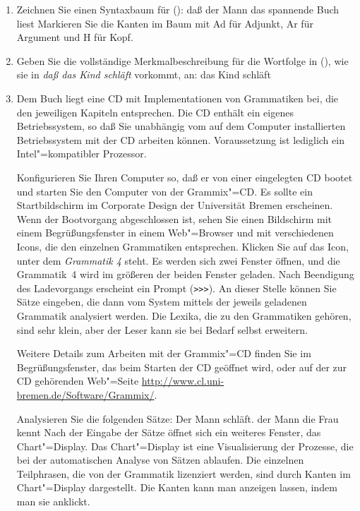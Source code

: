 \begin{enumerate}
\item Zeichnen Sie einen Syntaxbaum für ():
\ea
daß der Mann das spannende Buch liest
\z
Markieren Sie die Kanten im Baum mit Ad für Adjunkt, Ar für Argument und
H für Kopf.
\item Geben Sie die vollständige Merkmalbeschreibung für die Wortfolge in (), wie sie in
  \emph{daß das Kind schläft} vorkommt,  an:
      \ea
      das Kind schläft
      \z
\item\label{uebung-grammix-kapitel4}
      Dem Buch liegt eine CD mit Implementationen von Grammatiken bei, die
      den jeweiligen Kapiteln entsprechen. Die CD enthält ein eigenes Betriebssystem,
      so daß Sie unabhängig vom auf dem Computer installierten Betriebssystem
      mit der CD arbeiten können. Voraussetzung ist lediglich ein Intel"=kompatibler Prozessor.

      Konfigurieren Sie Ihren Computer so, daß er von einer eingelegten CD bootet und starten
      Sie den Computer von der Grammix"=CD. Es sollte ein Startbildschirm im Corporate
      Design der Universität Bremen erscheinen. Wenn der Bootvorgang abgeschlossen ist,
      sehen Sie einen Bildschirm mit einem Begrüßungsfenster in einem Web"=Browser und
      mit verschiedenen Icons, die den einzelnen Grammatiken
      entsprechen. Klicken Sie auf das Icon, unter dem \emph{Grammatik 4} steht. Es werden sich
      zwei Fenster öffnen, und die Grammatik~4 wird im größeren der beiden Fenster geladen.
      Nach Beendigung des Ladevorgangs erscheint ein Prompt (\verb+>>>+). An dieser Stelle
      können Sie Sätze eingeben, die dann vom System mittels der jeweils geladenen Grammatik
      analysiert werden. Die Lexika, die zu den Grammatiken gehören, sind sehr klein,
      aber der Leser kann sie bei Bedarf selbst erweitern.

      Weitere Details zum Arbeiten mit der Grammix"=CD finden Sie im Begrüßungsfenster,
      das beim Starten der CD geöffnet wird, oder auf der zur CD gehörenden Web"=Seite \url{http://www.cl.uni-bremen.de/Software/Grammix/}.

      Analysieren Sie die folgenden Sätze:
      \eal
      \ex Der Mann schläft.
      \ex der Mann die Frau kennt
      \zl
      Nach der Eingabe der Sätze öffnet sich ein weiteres Fenster, das Chart"=Display.
      Das Chart"=Display ist eine Visualisierung der Prozesse, die bei der automatischen
      Analyse von Sätzen ablaufen. Die einzelnen Teilphrasen, die von der
      Grammatik lizenziert werden, sind durch Kanten im Chart"=Display dargestellt. Die Kanten
      kann man anzeigen lassen, indem man sie anklickt.


\end{enumerate}
